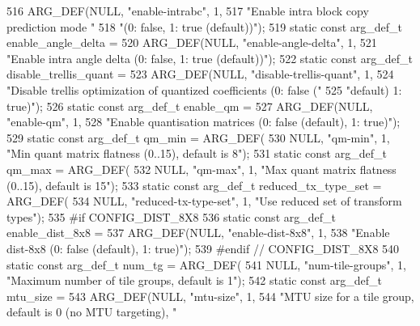 \begin{DoxyCodeInclude}
{{{{{{{516     ARG\_DEF(NULL, \textcolor{stringliteral}{"enable-intrabc"}, 1,
517             \textcolor{stringliteral}{"Enable intra block copy prediction mode "}
518             \textcolor{stringliteral}{"(0: false, 1: true (default))"});
519 \textcolor{keyword}{static} \textcolor{keyword}{const} arg\_def\_t enable\_angle\_delta =
520     ARG\_DEF(NULL, \textcolor{stringliteral}{"enable-angle-delta"}, 1,
521             \textcolor{stringliteral}{"Enable intra angle delta (0: false, 1: true (default))"});
522 \textcolor{keyword}{static} \textcolor{keyword}{const} arg\_def\_t disable\_trellis\_quant =
523     ARG\_DEF(NULL, \textcolor{stringliteral}{"disable-trellis-quant"}, 1,
524             \textcolor{stringliteral}{"Disable trellis optimization of quantized coefficients (0: false ("}
525             \textcolor{stringliteral}{"default) 1: true)"});
526 \textcolor{keyword}{static} \textcolor{keyword}{const} arg\_def\_t enable\_qm =
527     ARG\_DEF(NULL, \textcolor{stringliteral}{"enable-qm"}, 1,
528             \textcolor{stringliteral}{"Enable quantisation matrices (0: false (default), 1: true)"});
529 \textcolor{keyword}{static} \textcolor{keyword}{const} arg\_def\_t qm\_min = ARG\_DEF(
530     NULL, \textcolor{stringliteral}{"qm-min"}, 1, \textcolor{stringliteral}{"Min quant matrix flatness (0..15), default is 8"});
531 \textcolor{keyword}{static} \textcolor{keyword}{const} arg\_def\_t qm\_max = ARG\_DEF(
532     NULL, \textcolor{stringliteral}{"qm-max"}, 1, \textcolor{stringliteral}{"Max quant matrix flatness (0..15), default is 15"});
533 \textcolor{keyword}{static} \textcolor{keyword}{const} arg\_def\_t reduced\_tx\_type\_set = ARG\_DEF(
534     NULL, \textcolor{stringliteral}{"reduced-tx-type-set"}, 1, \textcolor{stringliteral}{"Use reduced set of transform types"});
535 \textcolor{preprocessor}{#if CONFIG\_DIST\_8X8}
536 \textcolor{keyword}{static} \textcolor{keyword}{const} arg\_def\_t enable\_dist\_8x8 =
537     ARG\_DEF(NULL, \textcolor{stringliteral}{"enable-dist-8x8"}, 1,
538             \textcolor{stringliteral}{"Enable dist-8x8 (0: false (default), 1: true)"});
539 \textcolor{preprocessor}{#endif  // CONFIG\_DIST\_8X8}
540 \textcolor{keyword}{static} \textcolor{keyword}{const} arg\_def\_t num\_tg = ARG\_DEF(
541     NULL, \textcolor{stringliteral}{"num-tile-groups"}, 1, \textcolor{stringliteral}{"Maximum number of tile groups, default is 1"});
542 \textcolor{keyword}{static} \textcolor{keyword}{const} arg\_def\_t mtu\_size =
543     ARG\_DEF(NULL, \textcolor{stringliteral}{"mtu-size"}, 1,
544             \textcolor{stringliteral}{"MTU size for a tile group, default is 0 (no MTU targeting), "}
}}}}}}}
\end{DoxyCodeInclude}
